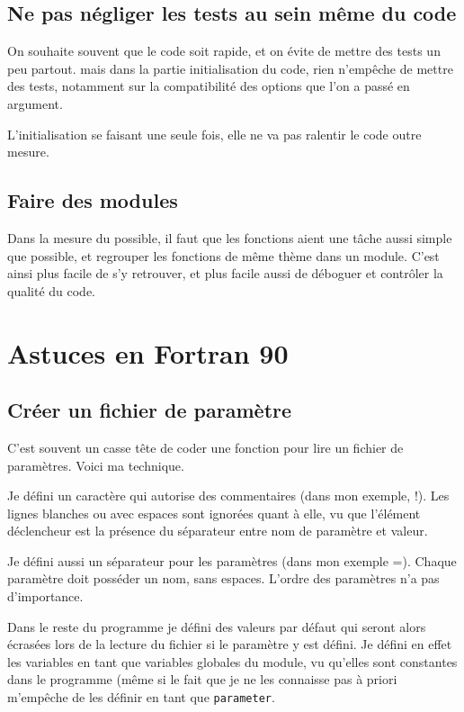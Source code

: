 \subsection{Ne pas négliger les tests au sein même du code}
On souhaite souvent que le code soit rapide, et on évite de mettre des tests un peu partout. mais dans la partie initialisation du code, rien n'empêche de mettre des tests, notamment sur la compatibilité des options que l'on a passé en argument. 

L'initialisation se faisant une seule fois, elle ne va pas ralentir le code outre mesure.

\subsection{Faire des modules}
Dans la mesure du possible, il faut que les fonctions aient une tâche aussi simple que possible, et regrouper les fonctions de même thème dans un module. C'est ainsi plus facile de s'y retrouver, et plus facile aussi de déboguer et contrôler la qualité du code. 

\section{Astuces en Fortran 90}

\subsection{Créer un fichier de paramètre}
C'est souvent un casse tête de coder une fonction pour lire un fichier de paramètres. Voici ma technique. 

Je défini un caractère qui autorise des commentaires (dans mon exemple, \og !\fg). Les lignes blanches ou avec espaces sont ignorées quant à elle, vu que l'élément déclencheur est la présence du séparateur entre nom de paramètre et valeur. 

Je défini aussi un séparateur pour les paramètres (dans mon exemple \og =\fg). Chaque paramètre doit posséder un nom, sans espaces. L'ordre des paramètres n'a pas d'importance. 

\begin{remarque}
Dans le reste du programme je défini des valeurs par défaut qui seront alors écrasées lors de la lecture du fichier si le paramètre y est défini. Je défini en effet les variables en tant que variables globales du module, vu qu'elles sont constantes dans le programme (même si le fait que je ne les connaisse pas à priori m'empêche de les définir en tant que \texttt{parameter}.
\end{remarque}


